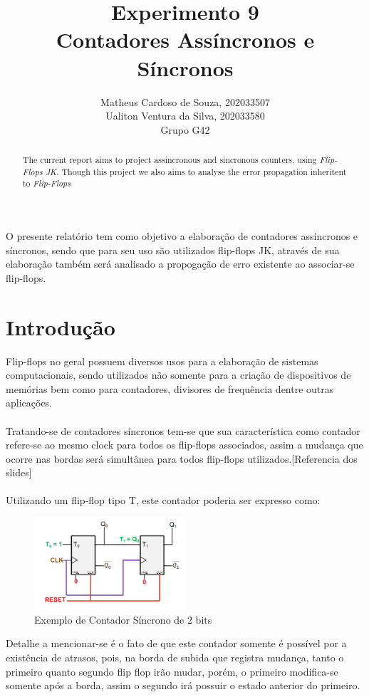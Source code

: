 \documentclass[12pt]{article}
\title{Experimento 9\\
Contadores Assíncronos e Síncronos}
\author{Matheus Cardoso de Souza, 202033507\\
        Ualiton Ventura da Silva, 202033580\\
        Grupo G42
}
\begin{document}
\maketitle

 \begin{abstract}
   The current report aims to project assincronous and sincronous counters,
   using \emph{Flip-Flops JK}. Though this project we also aims to analyse the
   error propagation inheritent to \emph{Flip-Flops}
 \end{abstract}

 \begin{resumo}
   O presente relatório tem como objetivo a elaboração de contadores assíncronos
   e síncronos, sendo que para seu uso são utilizados flip-flops JK, através de
   sua elaboração também será analisado a propogação de erro existente ao
   associar-se flip-flops.
 \end{resumo}


\section{Introdução}\label{sec:Introducao}

Flip-flops no geral possuem diversos usos para a elaboração de sistemas
computacionais, sendo utilizados não somente para a criação de dispositivos de
memórias bem como para contadores, divisores de frequência dentre outras
aplicações.\\ \\
Tratando-se de contadores síncronos tem-se que sua característica como contador
refere-se ao mesmo clock para todos os flip-flops associados, assim a mudança
que ocorre nas bordas será simultânea para todos flip-flops
utilizados.[Referencia dos slides] \\ \\
Utilizando um flip-flop tipo T, este contador poderia ser expresso como:
\begin{figure}[H]
  \centering
  \includegraphics[width=0.5\textwidth]{Exp09/images/ContadorSincrono.png}
  \caption{Exemplo de Contador Síncrono de 2 bits}\label{fig:ContadorSincrono.png}
\end{figure}
Detalhe a mencionar-se é o fato de que este contador somente é possível por a
existência de atrasos, pois, na borda de subida que registra mudança, tanto o
primeiro quanto segundo flip flop irão mudar, porém, o primeiro modifica-se
somente após a borda, assim o segundo irá possuir o estado anterior do primeiro.
\end{document}
